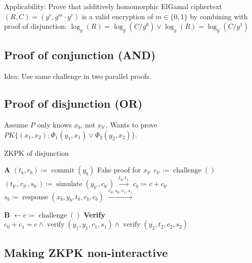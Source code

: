 Applicability: Prove that additively homomorphic ElGamal ciphertext $(R, C) =
(g^r, g^m \cdot y^r)$ is a valid encryption of $m \in \{0, 1\}$ by combining
with proof of disjunction: $\log_g(R) = \log_y(C / g^0) \lor \log_g(R) = \log_y(C / g^1)$

\subsection{Proof of conjunction (AND)}

Idea: Use same challenge in two parallel proofs.

\subsection{Proof of disjunction (OR)}

Assume $P$ only knows $x_b$, not $x_{b'}$. Wants to prove $PK\{ (x_1, x_2)
: \Phi_1(y_1, x_1) \lor \Phi_2(y_2, x_2) \}$.

\begin{algorithm}
		\caption{ZKPK of disjunction}

		\begin{multicols}{2}
				\begin{algorithmic}[0]
						\State \textbf{A}
						\State $(t_b, r_b) \coloneqq \operatorname{commit}(y_b)$
						\State Fake proof for $x_{b'}$
						\State $c_{b'} \coloneqq \operatorname{challenge}()$
						\State $(t_{b'}, r_{b'}, s_{b'}) \coloneqq \operatorname{simulate}(y_{b'}, c_{b'})$
						\State $\xrightarrow{t_0, t_1}$
						\State
						\State $c_b \coloneqq c + c_{b'}$
						\State $s_b \coloneqq \operatorname{response}(x_b, y_b, t_b, r_b, c_b)$
						\State $\xrightarrow{c_0, s_0, c_1, s_1}$
				\end{algorithmic}

				\columnbreak

				\begin{algorithmic}[0]
						\State \textbf{B}
						\State
						\State
						\State
						\State
						\State
						\State $\leftarrow c \coloneqq \operatorname{challenge}()$
						\State
						\State
						\State \textbf{Verify} $c_0 + c_1 = c \land \operatorname{verify}(y_1, y_1, c_1, s_1) \land \operatorname{verify}(y_2, t_2, c_2, s_2)$
				\end{algorithmic}
		\end{multicols}
\end{algorithm}

\subsection{Making ZKPK non-interactive}

